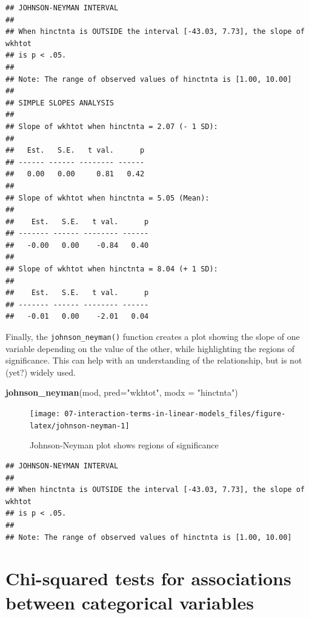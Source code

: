 \documentclass[
]{book}
\newenvironment{Shaded}{\begin{snugshade}}{\end{snugshade}}
\newcommand{\DataTypeTok}[1]{\textcolor[rgb]{0.13,0.29,0.53}{#1}}
\newcommand{\KeywordTok}[1]{\textcolor[rgb]{0.13,0.29,0.53}{\textbf{#1}}}
\newcommand{\NormalTok}[1]{#1}
\newcommand{\StringTok}[1]{\textcolor[rgb]{0.31,0.60,0.02}{#1}}
\begin{document}
\begin{verbatim}
## JOHNSON-NEYMAN INTERVAL 
## 
## When hinctnta is OUTSIDE the interval [-43.03, 7.73], the slope of wkhtot
## is p < .05.
## 
## Note: The range of observed values of hinctnta is [1.00, 10.00]
## 
## SIMPLE SLOPES ANALYSIS 
## 
## Slope of wkhtot when hinctnta = 2.07 (- 1 SD): 
## 
##   Est.   S.E.   t val.      p
## ------ ------ -------- ------
##   0.00   0.00     0.81   0.42
## 
## Slope of wkhtot when hinctnta = 5.05 (Mean): 
## 
##    Est.   S.E.   t val.      p
## ------- ------ -------- ------
##   -0.00   0.00    -0.84   0.40
## 
## Slope of wkhtot when hinctnta = 8.04 (+ 1 SD): 
## 
##    Est.   S.E.   t val.      p
## ------- ------ -------- ------
##   -0.01   0.00    -2.01   0.04
\end{verbatim}

Finally, the \texttt{johnson\_neyman()} function creates a plot showing the slope of one variable depending on the value of the other, while highlighting the regions of significance. This can help with an understanding of the relationship, but is not (yet?) widely used.

\begin{Shaded}
\begin{Highlighting}[]
\KeywordTok{johnson_neyman}\NormalTok{(mod, }\DataTypeTok{pred=}\StringTok{"wkhtot"}\NormalTok{, }\DataTypeTok{modx =} \StringTok{"hinctnta"}\NormalTok{)}
\end{Highlighting}
\end{Shaded}

\begin{figure}

{\centering \texttt{[image: 07-interaction-terms-in-linear-models\_files/figure-latex/johnson-neyman-1]} 

}

\caption{Johnson-Neyman plot shows regions of significance}\label{fig:johnson-neyman}
\end{figure}

\begin{verbatim}
## JOHNSON-NEYMAN INTERVAL 
## 
## When hinctnta is OUTSIDE the interval [-43.03, 7.73], the slope of wkhtot
## is p < .05.
## 
## Note: The range of observed values of hinctnta is [1.00, 10.00]
\end{verbatim}

\hypertarget{chi-squared-tests-for-associations-between-categorical-variables}{%
\chapter{Chi-squared tests for associations between categorical variables}\label{chi-squared-tests-for-associations-between-categorical-variables}}
\end{document}
